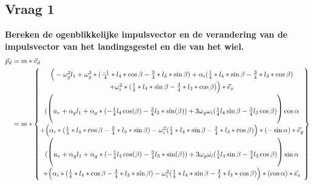 \documentclass[a4paper,10pt]{article}
\begin{document}
\subsection{Vraag 1}
\textbf{Bereken de ogenblikkelijke impulsvector en de verandering van de impulsvector van het landingsgestel en die van het wiel.}\\
\begin{equation}
\begin{aligned}
\vec{p}_d &= m *\vec{v}_d \\
&= m * \begin{Bmatrix}
\Big( -\omega^{2}_g l_1 +\omega_{g}^{2} * (\frac{-1}{4}*l_4*\cos{\beta}-\frac{3}{4}*l_3*\sin{\beta})+\alpha_i(\frac{1}{4}*l_4 *\sin{\beta}-\frac{3}{4}*l_3 * \cos{\beta})\\ + \omega_i^2*(\frac{1}{4}*l_4 *\sin{\beta}-\frac{3}{4}*l_3 * \cos{\beta}) \Big)* \vec{e}_{x}\\
\Huge(\Big(a_v +\alpha_g l_1 +\alpha_g *({-\frac{1}{4}}  l_4 \cos(\beta)-\frac{3}{4}l_3*\sin(\beta)) + 3\omega_g\omega_i(\frac{1}{4}l_4 \sin{\beta}-\frac{3}{4}l_3  \cos{\beta})\Big)\cos{\alpha}\\ + \Big(\alpha_i * (\frac{1}{4}*l_4*\cos{\beta} - \frac{3}{4}*l_3 * \sin{\beta}) - \omega_i^2(\frac{1}{4}*l_4 *\sin{\beta}-\frac{3}{4}*l_3 * \cos{\beta})\Big)*(-\sin{\alpha}\Huge)*\vec{e}_{y}\\
\Huge(\Big(a_v +\alpha_g l_1 +\alpha_g *({-\frac{1}{4}}  l_4 \cos(\beta)-\frac{3}{4}l_3*\sin(\beta)) + 3\omega_g\omega_i(\frac{1}{4}l_4 \sin{\beta}-\frac{3}{4}l_3  \cos{\beta})\Big)\sin{\alpha}\\ + \Big(\alpha_i * (\frac{1}{4}*l_4*\cos{\beta} - \frac{3}{4}*l_3 * \sin{\beta}) - \omega_i^2(\frac{1}{4}*l_4 *\sin{\beta}-\frac{3}{4}*l_3 * \cos{\beta})\Big)*(\cos{\alpha}\Huge)*\vec{e}_{z}
\end{Bmatrix}
\end{aligned}
\end{equation} 
\end{document}
